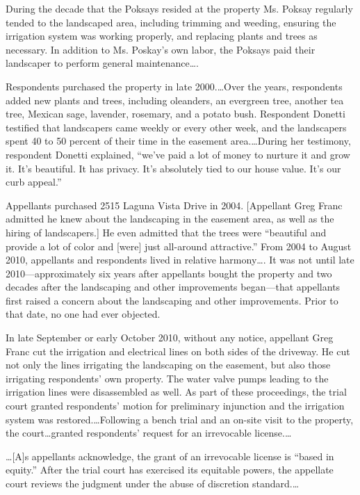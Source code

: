 During the decade that the Poksays resided at the property Ms. Poksay regularly
tended to the landscaped area, including trimming and weeding, ensuring the
irrigation system was working properly, and replacing plants and trees as
necessary. In addition to Ms. Poskay's own labor, the Poksays paid their
landscaper to perform general maintenance\ldots.

Respondents purchased the property in late 2000.\ldots Over the years,
respondents added new plants and trees, including oleanders, an evergreen tree,
another tea tree, Mexican sage, lavender, rosemary, and a potato bush.
Respondent Donetti testified that landscapers came weekly or every other week,
and the landscapers spent 40 to 50 percent of their time in the easement
area.\ldots During her testimony, respondent Donetti explained, ``we've paid a
lot of money to nurture it and grow it. It's beautiful. It has privacy. It's
absolutely tied to our house value. It's our curb appeal.''

Appellants purchased 2515 Laguna Vista Drive in 2004. [Appellant Greg Franc
admitted he knew about the landscaping in the easement area, as well as the
hiring of landscapers.] He even admitted that the trees were ``beautiful and
provide a lot of color and [were] just all-around attractive.'' From 2004 to
August 2010, appellants and respondents lived in relative harmony\ldots. It was
not until late 2010---approximately six years after appellants bought the
property and two decades after the landscaping and other improvements
began---that appellants first raised a concern about the landscaping and other
improvements. Prior to that date, no one had ever objected.

In late September or early October 2010, without any notice, appellant Greg
Franc cut the irrigation and electrical lines on both sides of the driveway. He
cut not only the lines irrigating the landscaping on the easement, but also
those irrigating respondents' own property. The water valve pumps leading to the
irrigation lines were disassembled as well. As part of these proceedings, the
trial court granted respondents' motion for preliminary injunction and the
irrigation system was restored.\ldots Following a bench trial and an on-site
visit to the property, the court\ldots granted respondents' request for an
irrevocable license.\dots

\ldots [A]s appellants acknowledge, the grant of an irrevocable license is
``based in equity.'' After the trial court has exercised its equitable powers,
the appellate court reviews the judgment under the abuse of discretion
standard.\dots

